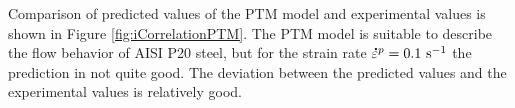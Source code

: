 \documentclass[twoside,english,1p,final,sort&compress]{elsarticle}
\theoremstyle{plain}
\newcommand{\mdot}[1]{\accentset{\mbox{\bfseries .}}{#1}}
\begin{document}
Comparison of predicted values of the PTM model and experimental values is shown in Figure \ref{fig:iCorrelationPTM}. The PTM model is suitable to describe the ﬂow behavior of AISI P20 steel, but for the strain rate $\mdot{\varepsilon}^p = 0.1\ \text{s}^{-1}$ the prediction in not quite good. The deviation between the predicted values and the experimental values is relatively good.
\begin{table}[!h]
\centering{}
\caption{Parameters of PTM model\label{tab:PTM-parameters}}
\end{table}
\end{document}
